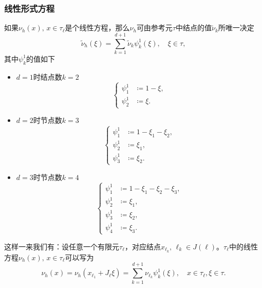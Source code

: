 \subsubsection{线性形式方程}
如果$\nu_{h}(x), \, x \in \tau_{\ell}$是个线性方程，那么$\nu_{h}$可由参考元$\tau$中结点的值$\widetilde{\nu}_{k}$所唯一决定
\begin{equation}
  \label{eq:finele-form-lin-nuh-nuk}
  \widetilde{\nu}_{h}\left( \xi \right)
  = \sum_{k=1}^{d+1} \widetilde{\nu}_{k} \psi_{k}^{1}\left( \xi \right), \quad \xi \in \tau,
\end{equation}
其中$\psi_{k}^{1}$的值如下
\begin{itemize}
  \item $d=1$时结点数$k=2$
  \begin{equation*}
    \begin{cases}
      \psi_{1}^{1} & \coloneqq 1 - \xi,\\
      \psi_{2}^{1} & \coloneqq \xi.
    \end{cases}
  \end{equation*}
  \item $d=2$时节点数$k=3$
  \begin{equation*}
    \begin{cases}
      \psi_{1}^{1} & \coloneqq 1 - \xi_{1} - \xi_{2}, \\
      \psi_{2}^{1} & \coloneqq \xi_{1}, \\
      \psi_{3}^{1} & \coloneqq \xi_{2}.
    \end{cases}
  \end{equation*}
  \item $d=3$时节点数$k=4$
  \begin{equation*}
    \begin{cases}
      \psi_{1}^{1} & \coloneqq 1 - \xi_{1} - \xi_{2} - \xi_{3}, \\
      \psi_{2}^{1} & \coloneqq \xi_{1}, \\
      \psi_{3}^{1} & \coloneqq \xi_{2}, \\
      \psi_{4}^{1} & \coloneqq \xi_{3}.
    \end{cases}
  \end{equation*}
\end{itemize}

这样一来我们有：设任意一个有限元$\tau_{\ell}$，对应结点$x_{\ell_{k}}, \, \ell_{k} \in J(\ell)$。$\tau_{\ell}$中的线性方程$\nu_{h}(x), \, x \in \tau_{\ell}$可以写为
\begin{equation}
  \label{eq:finele-form-lin-nuh-reprensentation}
  \nu_{h} \left( x \right)
  = \nu_{h} \left( x_{\ell_{1}} + J_{\ell} \xi \right)
  = \sum_{k=1}^{d+1} \nu_{\ell_{k}} \psi_{k}^{1} \left( \xi \right), \quad x \in \tau_{\ell}, \xi \in \tau.
\end{equation}

